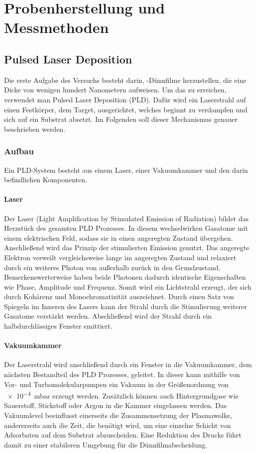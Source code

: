 \section{Probenherstellung und Messmethoden}\label{sec:messmethoden}

\subsection{Pulsed Laser Deposition}\label{subsec:pld}
Die erste Aufgabe des Versuchs besteht darin, \heo-Dünnfilme herzustellen, die eine Dicke von wenigen hundert
Nanometern aufweisen.
Um das zu erreichen, verwendet man Pulsed Laser Deposition (PLD).
Dafür wird ein Laserstrahl auf einen Festkörper, dem Target, ausgerichtet, welches beginnt zu
verdampfen und sich auf ein Substrat absetzt.
Im Folgenden soll dieser Mechanismus genauer beschrieben werden.

\subsubsection{Aufbau}
Ein PLD-System besteht aus einem Laser, einer Vakuumkammer und den darin befindlichen Komponenten.

\paragraph{Laser}
Der Laser (Light Amplification by Stimulated Emission of Radiation) bildet das Herzstück des gesamten PLD Prozesses.
In diesem wechselwirken Gasatome mit einem elektrischen Feld, sodass sie in einen angeregten Zustand übergehen.
Anschließend wird das Prinzip der stimulierten Emission genutzt.
Das angeregte Elektron verweilt vergleichsweise lange im angeregten Zustand und relaxiert durch ein
weiteres Photon von außerhalb zurück in den Grundzustand.
Bemerkenswerterweise haben beide Photonen dadurch identische Eigenschaften wie Phase, Amplitude und Frequenz.
Somit wird ein Lichtstrahl erzeugt, der sich durch Kohärenz und Monochromatizität auszeichnet.
Durch einen Satz von Spiegeln im Inneren des Lasers kann der Strahl durch die Stimulierung weiterer Gasatome
verstärkt werden.
Abschließend wird der Strahl durch ein halbdurchlässiges Fenster emittiert. \autocite[2296-2297]{pld}

\paragraph{Vakuumkammer}
Der Laserstrahl wird anschließend durch ein Fenster in die Vakuumkammer, dem nächsten Bestandteil des PLD Prozesses,
geleitet.
In dieser kann mithilfe von Vor- und Turbomolekularpumpen ein Vakuum in der Größenordnung von
\qty{e-4}{\milli\bar} erzeugt werden.
Zusätzlich können auch Hintergrundgase wie Sauerstoff, Stickstoff oder Argon in die Kammer eingelassen werden.
Das Vakuumlevel beeinflusst einerseits die Zusammensetzung der Plasmawolke, andererseits auch die
Zeit, die benötigt wird, um eine einzelne Schicht von Adsorbaten auf dem Substrat abzuscheiden.
Eine Reduktion des Drucks führt damit zu einer stabileren Umgebung für die Dünnfilmabscheidung.\autocite[2297-2298]{pld}


